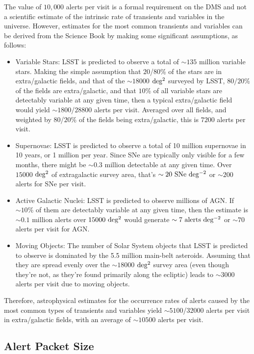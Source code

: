 \documentclass[DM,authoryear,toc]{lsstdoc}
\begin{document}
The value of $10,000$ alerts per visit is a formal requirement on the DMS and not a scientific estimate of the intrinsic rate of transients and variables in the universe. However, estimates for the most common transients and variables can be derived from the Science Book \citep{2009arXiv0912.0201L} by making some significant assumptions, as follows:
\begin{itemize}
\item Variable Stars: LSST is predicted to observe a total of $\sim135$ million variable stars. Making the simple assumption that $20$/$80$\% of the stars are in extra/galactic fields, and that of the $\sim18000$ $\rm deg^2$ surveyed by LSST, $80$/$20$\% of the fields are extra/galactic, and that $10$\% of all variable stars are detectably variable at any given time, then a typical extra/galactic field would yield $\sim1800$/$28800$ alerts per visit. Averaged over all fields, and weighted by $80$/$20$\% of the fields being extra/galactic, this is $7200$ alerts per visit.
\item Supernovae: LSST is predicted to observe a total of 10 million supernovae in 10 years, or 1 million per year. Since SNe are typically only visible for a few months, there might be $\sim0.3$ million detectable at any given time. Over $15000$ $\rm deg^{2}$ of extragalactic survey area, that's $\sim20\ {\rm SNe\ deg^{-2}}$ or $\sim200$ alerts for SNe per visit.
\item Active Galactic Nuclei: LSST is predicted to observe millions of AGN. If $\sim10\%$ of them are detectably variable at any given time, then the estimate is $\sim0.1$ million alerts over $15000\ {\rm deg^2}$ would generate $\sim7\ {\rm alerts\ deg^{-2}}$ or $\sim70$ alerts per visit for AGN.
\item Moving Objects: The number of Solar System objects that LSST is predicted to observe is dominated by the 5.5 million main-belt asteroids. Assuming that they are spread evenly over the $\sim18000$ $\rm deg^2$ survey area (even though they're not, as they're found primarily along the ecliptic) leads to $\sim3000$ alerts per visit due to moving objects.
\end{itemize} 
Therefore, astrophysical estimates for the occurrence rates of alerts caused by the most common types of transients and variables yield $\sim5100$/$32000$ alerts per visit in extra/galactic fields, with an average of $\sim10500$ alerts per visit.


\subsection{Alert Packet Size}\label{ssec:packet_size}
\end{document}
